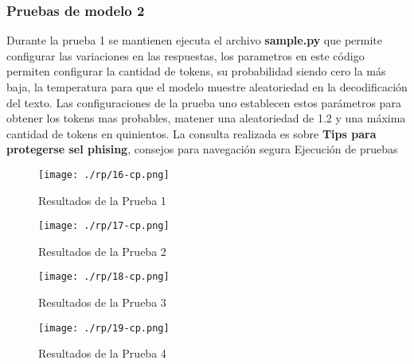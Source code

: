 \subsubsection{ Pruebas de modelo 2}\label{section:Validación del prototipo}
Durante la prueba 1 se mantienen ejecuta el archivo \textbf{sample.py} que permite configurar las variaciones en las respuestas, los parametros en este código permiten configurar la cantidad de tokens, su probabilidad siendo cero la más baja, la temperatura para que el modelo muestre aleatoriedad en la decodificación del texto. Las configuraciones de la prueba uno establecen estos parámetros para obtener los tokens mas probables, matener una aleatoriedad de 1.2 y una máxima cantidad de tokens en quinientos.  La consulta realizada es sobre \textbf{Tips para protegerse sel phising}, {consejos para navegación segura}
Ejecución de pruebas
\begin{figure}[H]
   \centering %
       \texttt{[image: ./rp/16-cp.png]} 
   \caption{Resultados de la Prueba 1\cite{}}
  \label{figure:Prueba1}  %
\end{figure}
\begin{figure}[H]
   \centering %
       \texttt{[image: ./rp/17-cp.png]} 
   \caption{Resultados de la Prueba 2\cite{}}
  \label{figure:Prueba2}  %
\end{figure}
\begin{figure}[H]
   \centering %
       \texttt{[image: ./rp/18-cp.png]} 
   \caption{Resultados de la Prueba 3\cite{}}
  \label{figure:Resultado prueba 3}  %
\end{figure}
\begin{figure}[H]
   \centering %
       \texttt{[image: ./rp/19-cp.png]} 
   \caption{Resultados de la Prueba 4\cite{}}
  \label{figure:Resultado prueba 4}  %
\end{figure}


